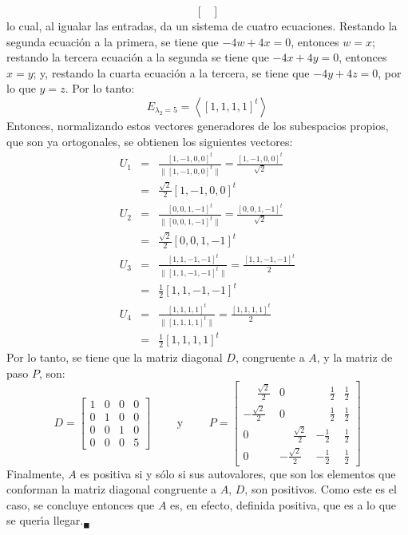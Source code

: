 \begin{solucion}
\begin{equation*}
\begin{bmatrix}
  \end{bmatrix}
 \end{equation*}
 lo cual, al igualar las entradas, da un sistema de cuatro ecuaciones. Restando la segunda ecuaci\'on a la primera, se tiene que $-4w + 4x = 0$, entonces $w = x$; restando la tercera ecuaci\'on a la segunda se tiene que $-4x + 4y = 0$, entonces $x = y$; y, restando la cuarta ecuaci\'on a la tercera, se tiene que $-4y + 4z = 0$, por lo que $y=z$. Por lo tanto:
 \begin{equation*}
  E_{\lambda_2 = 5} = \left< [1,1,1,1]^t \right>
 \end{equation*}
 Entonces, normalizando estos vectores generadores de los subespacios propios, que son ya ortogonales, se obtienen los siguientes vectores:
 \begin{eqnarray*}
  U_1 & = & \frac{[1,-1,0,0]^t}{\lVert [1,-1,0,0]^t \rVert} = \frac{[1,-1,0,0]^t}{\sqrt{2}}
  \\
  & = & \frac{\sqrt{2}}{2}[1,-1,0,0]^t \\
  U_2 & = & \frac{[0,0,1,-1]^t}{\lVert [0,0,1,-1]^t \rVert} = \frac{[0,0,1,-1]^t}{\sqrt{2}}
  \\
  & = & \frac{\sqrt{2}}{2}[0,0,1,-1]^t \\
  U_3 & = & \frac{[1,1,-1,-1]^t}{\lVert [1,1,-1,-1]^t \rVert} = \frac{[1,1,-1,-1]^t}{2} \\
  & = & \frac{1}{2}[1,1,-1,-1]^t \\
  U_4 & = & \frac{[1,1,1,1]^t}{\lVert [1,1,1,1]^t \rVert} = \frac{[1,1,1,1]^t}{2} \\
  & = & \frac{1}{2}[1,1,1,1]^t
 \end{eqnarray*}
 Por lo tanto, se tiene que la matriz diagonal $D$, congruente a $A$, y la matriz de paso $P$, son:
 \begin{equation*}
  D = 
  \begin{bmatrix}
   1 & 0 & 0 & 0 \\
   0 & 1 & 0 & 0 \\
   0 & 0 & 1 & 0 \\
   0 & 0 & 0 & 5
  \end{bmatrix}
  \qquad \text{ y } \qquad 
  P = 
  \begin{bmatrix}
   \phantom{-}\frac{\sqrt{2}}{2} & 0 & \phantom{-}\frac{1}{2} & \frac{1}{2} \\
   -\frac{\sqrt{2}}{2} & 0 & \phantom{-}\frac{1}{2} & \frac{1}{2} \\
   0 & \phantom{-}\frac{\sqrt{2}}{2} & -\frac{1}{2} & \frac{1}{2} \\
   0 & -\frac{\sqrt{2}}{2} & - \frac{1}{2} & \frac{1}{2}
  \end{bmatrix}
 \end{equation*}
 Finalmente, $A$ es positiva si y s\'olo si sus autovalores, que son los elementos que conforman la matriz diagonal congruente a $A$, $D$, son positivos. Como este es el caso, se concluye entonces que $A$ es, en efecto, definida positiva, que es a lo que se quer\'{\i}a llegar.${}_{\blacksquare}$
\end{solucion}

